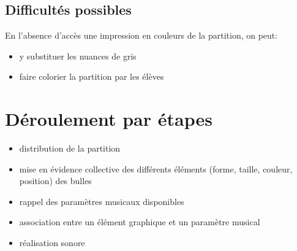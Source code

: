\documentclass[a4paper,11pt,bibliography=totoc,numbers=noenddot,listof=flat,DIV=11,BCOR=0mm]{scrreprt}%
\begin{document}
\subsection*{Difficultés possibles}
En l'absence d'accès  une impression en couleurs de la partition, on peut:
\begin{itemize}
\item y substituer les nuances de gris
\item faire colorier la partition par les élèves
\end{itemize}


\section*{Déroulement par étapes}
\begin{itemize}
\item distribution de la partition
\item mise en évidence collective des différents éléments (forme, taille, couleur, position) des bulles
\item rappel des paramètres musicaux disponibles
\item association entre un élément graphique et un paramètre musical
\item réalisation sonore
\end{itemize}

%
%    

\newpage
\begin{center}
\end{center}
\end{document}
